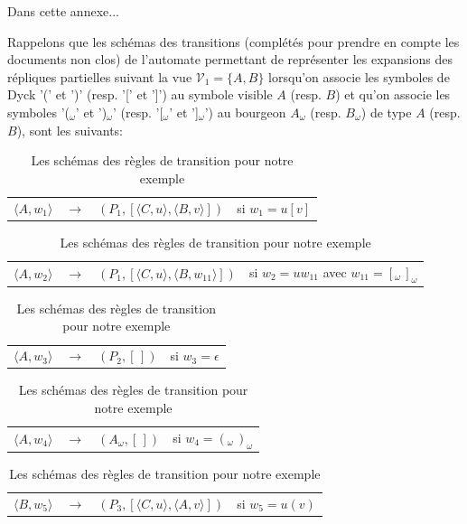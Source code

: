 \label{annexeFusions}
\mySaveMarks
Dans cette annexe...

Rappelons que les schémas des transitions (complétés pour prendre en compte les documents non clos) de l'automate permettant de représenter les expansions des répliques partielles suivant la vue $\mathcal{V}_1 = \{A,B\}$ lorsqu'on associe les symboles de Dyck '(' et ')' (resp. '[' et ']') au symbole visible $A$ (resp. $B$) et qu'on associe les symboles '($_{\omega}$' et ')$_{\omega}$' (resp. '[$_{\omega}$' et ']$_{\omega}$') au bourgeon $A_{\omega}$ (resp. $B_{\omega}$) de type $A$ (resp. $B$), sont les suivants:

\begin{table}
	\caption{Les schémas des règles de transition pour notre exemple}
	\begin{flushleft}
	\begin{tabular}[t]{lcp{5.3cm}l}
	$\langle A,w_{1} \rangle$ & $\longrightarrow$ & $(P_{1}, [\langle C,u \rangle, \langle B,v \rangle])$ & si $w_{1}=u[v]$ \\
	
	\end{tabular}
	\begin{tabular}[t]{lcp{5.3cm}l}
	
	$\langle A,w_{2} \rangle$ & $\longrightarrow$ & $(P_{1}, [\langle C,u \rangle, \langle B,w_{11} \rangle])$ & si $w_{2}=uw_{11}$ avec $w_{11}=[_{\omega}\, ]_{\omega}$ \\
	
	\end{tabular}
	\begin{tabular}[t]{lcp{5.3cm}l}
	
	$\langle A,w_{3} \rangle$ & $\longrightarrow$ & $(P_{2}, [\,])$ & si $w_{3}=\epsilon$\\
	
	\end{tabular}
	\begin{tabular}[t]{lcp{5.3cm}l}
	
	$\langle A,w_{4} \rangle$ & $\longrightarrow$ & $(A_{\omega}, [\,])$ & si $w_{4}=(_{\omega}\, )_{\omega}$\\
	
	\end{tabular}
	\begin{tabular}[t]{lcp{5.3cm}l}
	
	$\langle B,w_{5} \rangle$ & $\longrightarrow$ & $(P_{3}, [\langle C,u \rangle, \langle A,v \rangle])$ & si $w_{5}=u(v)$ \\
	

\end{tabular}
\end{flushleft}
\end{table}
